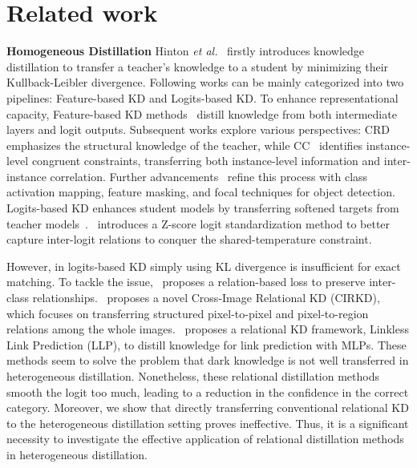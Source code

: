 \section{Related work}
\label{sec:related_work}

\textbf{Homogeneous Distillation}
Hinton \textit{et al.}~\cite{hinton2015distilling} firstly introduces knowledge distillation to transfer a teacher’s knowledge to a student by minimizing their Kullback-Leibler divergence. Following works can be mainly categorized into two pipelines: Feature-based KD and Logits-based KD. To enhance representational capacity, Feature-based KD methods~\cite{romero2014fitnets,park2019relational} distill knowledge from both intermediate layers and logit outputs. Subsequent works explore various perspectives: CRD~\cite{tian2019contrastive} emphasizes the structural knowledge of the teacher, while CC~\cite{peng2019correlation} identifies instance-level congruent constraints, transferring both instance-level information and inter-instance correlation. Further advancements~\cite{guo2023class,yang2022masked,yang2022focal} refine this process with class activation mapping, feature masking, and focal techniques for object detection. Logits-based KD enhances student models by transferring softened targets from teacher models~\cite{hinton2015distilling,zhao2022decoupled}.~\cite{sun2024logit} introduces a Z-score logit standardization method to better capture inter-logit relations to conquer the shared-temperature constraint. 

However, in logits-based KD simply using KL divergence is insufficient for exact matching. To tackle the issue,~\cite{huang2022knowledge} proposes a relation-based loss to preserve inter-class relationships.~\cite{yang2022crossimagerelationalknowledgedistillation} proposes a novel Cross-Image Relational KD (CIRKD), which focuses on transferring structured pixel-to-pixel and pixel-to-region relations among the whole images.~\cite{guo2023linklesslinkpredictionrelational} proposes a relational KD framework, Linkless Link Prediction (LLP), to distill knowledge for link prediction with MLPs. These methods seem to solve the problem that dark knowledge is not well transferred in heterogeneous distillation.
Nonetheless, these relational distillation methods 
smooth the logit too much, leading to a reduction in the confidence in the correct category. Moreover, we show that directly transferring conventional relational KD to the heterogeneous distillation setting proves ineffective. Thus, it is a significant necessity to investigate the effective application of relational distillation methods in heterogeneous distillation. 

